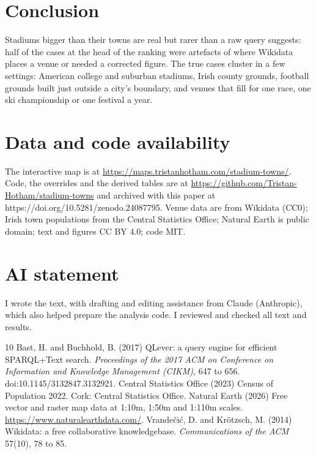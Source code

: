 \documentclass[11pt,a4paper]{article}
\begin{document}
\section{Conclusion}
Stadiums bigger than their towns are real but rarer than a raw query suggests: half of the cases at the head of the ranking were artefacts of where Wikidata places a venue or needed a corrected figure. The true cases cluster in a few settings: American college and suburban stadiums, Irish county grounds, football grounds built just outside a city's boundary, and venues that fill for one race, one ski championship or one festival a year.

\section*{Data and code availability}
The interactive map is at \url{https://maps.tristanhotham.com/stadium-towns/}. Code, the overrides and the derived tables are at \url{https://github.com/Tristan-Hotham/stadium-towns} and archived with this paper at https://doi.org/10.5281/zenodo.24087795. Venue data are from Wikidata (CC0); Irish town populations from the Central Statistics Office; Natural Earth is public domain; text and figures CC BY 4.0; code MIT.

\section*{AI statement}
I wrote the text, with drafting and editing assistance from Claude (Anthropic), which also helped prepare the analysis code. I reviewed and checked all text and results.

\begin{thebibliography}{10}
 Bast, H. and Buchhold, B. (2017) QLever: a query engine for efficient SPARQL+Text search. \textit{Proceedings of the 2017 ACM on Conference on Information and Knowledge Management (CIKM)}, 647 to 656. doi:10.1145/3132847.3132921.
 Central Statistics Office (2023) Census of Population 2022. Cork: Central Statistics Office.
 Natural Earth (2026) Free vector and raster map data at 1:10m, 1:50m and 1:110m scales. \url{https://www.naturalearthdata.com/}.
 Vrandečić, D. and Krötzsch, M. (2014) Wikidata: a free collaborative knowledgebase. \textit{Communications of the ACM} 57(10), 78 to 85.
\end{thebibliography}
\end{document}
